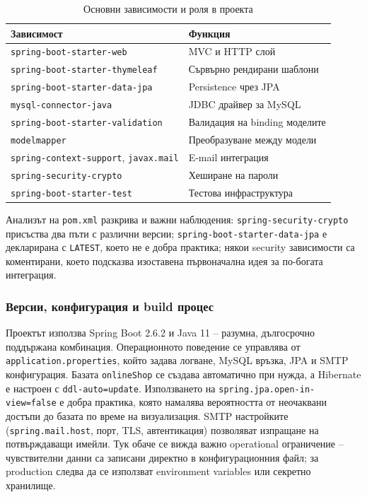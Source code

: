 \begin{table}[H]
    \centering
    \caption{Основни зависимости и роля в проекта}
    \label{tab:maven-dependencies}
    \begin{tabularx}{\textwidth}{L{4.5cm}Y}
        \toprule
        Зависимост & Функция \\
        \midrule
        \texttt{spring-boot-starter-web} & MVC и HTTP слой \cite{springboot,springmvc} \\
        \texttt{spring-boot-starter-thymeleaf} & Сървърно рендирани шаблони \cite{thymeleaf} \\
        \texttt{spring-boot-starter-data-jpa} & Persistence чрез JPA \cite{springdatajpa} \\
        \texttt{mysql-connector-java} & JDBC драйвер за MySQL \cite{mysql} \\
        \texttt{spring-boot-starter-validation} & Валидация на binding моделите \cite{hibernatevalidator} \\
        \texttt{modelmapper} & Преобразуване между модели \cite{modelmapper} \\
        \texttt{spring-context-support}, \texttt{javax.mail} & E-mail интеграция \cite{springmail} \\
        \texttt{spring-security-crypto} & Хеширане на пароли \cite{springsecuritycrypto} \\
        \texttt{spring-boot-starter-test} & Тестова инфраструктура \\
        \bottomrule
    \end{tabularx}
\end{table}

Анализът на \texttt{pom.xml} разкрива и важни наблюдения: \texttt{spring-security-crypto} присъства два пъти с различни версии; \texttt{spring-boot-starter-data-jpa} е декларирана с \texttt{LATEST}, което не е добра практика; някои security зависимости са коментирани, което подсказва изоставена първоначална идея за по-богата интеграция.

\subsubsection{Версии, конфигурация и build процес}

Проектът използва Spring Boot 2.6.2 и Java 11 -- разумна, дългосрочно поддържана комбинация. Операционното поведение се управлява от \texttt{application.properties}, който задава логване, MySQL връзка, JPA и SMTP конфигурация. Базата \texttt{onlineShop} се създава автоматично при нужда, а Hibernate е настроен с \texttt{ddl-auto=update}. Използването на \texttt{spring.jpa.open-in-view=false} е добра практика, която намалява вероятността от неочаквани достъпи до базата по време на визуализация. SMTP настройките (\texttt{spring.mail.host}, порт, TLS, автентикация) позволяват изпращане на потвърждаващи имейли. Тук обаче се вижда важно operational ограничение -- чувствителни данни са записани директно в конфигурационния файл; за production следва да се използват environment variables или секретно хранилище.

